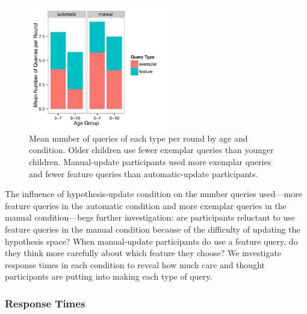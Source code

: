 \documentclass[man,floatsintext]{apa6}
\begin{document}
\begin{figure}[h]
  \centering
  \includegraphics[width=0.55\textwidth]{figures/clicks_by_ageGroup_condition_query_type}
  \caption{Mean number of queries of each type per round by age and condition. Older children use fewer exemplar queries than younger children. Manual-update participants used more exemplar queries and fewer feature queries than automatic-update participants.}
  \label{fig:clicks-per-agecond}
\end{figure} 

The influence of hypothesis-update condition on the number queries used---more feature queries in the automatic condition and more exemplar queries in the manual condition---begs further investigation: are participants reluctant to use feature queries in the manual condition because of the difficulty of updating the hypothesis space? When manual-update participants do use a feature query, do they think more carefully about which feature they choose? We investigate response times in each condition to reveal how much care and thought participants are putting into making each type of query.

  
 
\subsubsection{Response Times}
\end{document}
